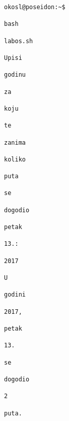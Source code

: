 \documentclass{exam}
\begin{document}
\begin{itemize}
                                                                                                \begin{lstlisting}[caption={Ispis}]
                                                                                                okosl@poseidon:~$
                                                                                                bash
                                                                                                labos.sh 
                                                                                                Upisi
                                                                                                godinu
                                                                                                za
                                                                                                koju
                                                                                                te
                                                                                                zanima
                                                                                                koliko
                                                                                                puta
                                                                                                se
                                                                                                dogodio
                                                                                                petak
                                                                                                13.:
                                                                                                2017
                                                                                                U
                                                                                                godini
                                                                                                2017,
                                                                                                petak
                                                                                                13.
                                                                                                se
                                                                                                dogodio
                                                                                                2
                                                                                                puta.


\end{lstlisting}
\end{itemize}
\end{document}
